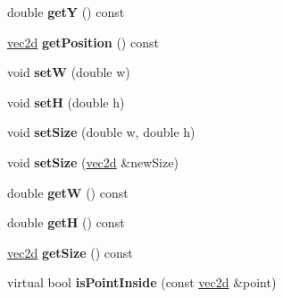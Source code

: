 \begin{DoxyCompactItemize}
\item 
\hypertarget{class_c_gui_panel_a9649f27f171ec883d409a140d6e92d18}{
double {\bfseries getY} () const }
\label{class_c_gui_panel_a9649f27f171ec883d409a140d6e92d18}

\item 
\hypertarget{class_c_gui_panel_a7a59458261fb94ddc653886ed7c9f0ee}{
\hyperlink{classvec2d}{vec2d} {\bfseries getPosition} () const }
\label{class_c_gui_panel_a7a59458261fb94ddc653886ed7c9f0ee}

\item 
\hypertarget{class_c_gui_panel_a99073e1362da5d946af99efa926d9c77}{
void {\bfseries setW} (double w)}
\label{class_c_gui_panel_a99073e1362da5d946af99efa926d9c77}

\item 
\hypertarget{class_c_gui_panel_a9451916191bc9ce7e119935c8c18c3e9}{
void {\bfseries setH} (double h)}
\label{class_c_gui_panel_a9451916191bc9ce7e119935c8c18c3e9}

\item 
\hypertarget{class_c_gui_panel_a37a01124bddd2b04908687862de69485}{
void {\bfseries setSize} (double w, double h)}
\label{class_c_gui_panel_a37a01124bddd2b04908687862de69485}

\item 
\hypertarget{class_c_gui_panel_aa4324d9062bd96d144155ba34c29176a}{
void {\bfseries setSize} (\hyperlink{classvec2d}{vec2d} \&newSize)}
\label{class_c_gui_panel_aa4324d9062bd96d144155ba34c29176a}

\item 
\hypertarget{class_c_gui_panel_a1f6ae8a25aeca17fe999df96422890c3}{
double {\bfseries getW} () const }
\label{class_c_gui_panel_a1f6ae8a25aeca17fe999df96422890c3}

\item 
\hypertarget{class_c_gui_panel_aeafe7467c433157b4584a692372f290d}{
double {\bfseries getH} () const }
\label{class_c_gui_panel_aeafe7467c433157b4584a692372f290d}

\item 
\hypertarget{class_c_gui_panel_aae531b29822cd2e386014d4e83621efd}{
\hyperlink{classvec2d}{vec2d} {\bfseries getSize} () const }
\label{class_c_gui_panel_aae531b29822cd2e386014d4e83621efd}

\item 
\hypertarget{class_c_gui_panel_af1c7784645d5cc3654c67d2b4a5759a6}{
virtual bool {\bfseries isPointInside} (const \hyperlink{classvec2d}{vec2d} \&point)}
\label{class_c_gui_panel_af1c7784645d5cc3654c67d2b4a5759a6}


\end{DoxyCompactItemize}
